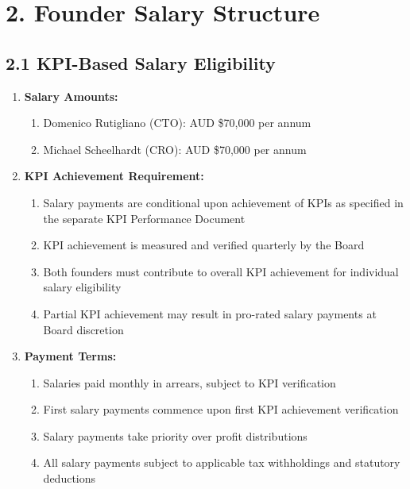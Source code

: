 \section*{2. Founder Salary Structure}

\subsection*{2.1 KPI-Based Salary Eligibility}
\begin{enumerate}[label=\arabic*.]
\item \textbf{Salary Amounts:}
    \begin{enumerate}[label=(\alph*)]
    \item Domenico Rutigliano (CTO): AUD \$70,000 per annum
    \item Michael Scheelhardt (CRO): AUD \$70,000 per annum
    \end{enumerate}

\item \textbf{KPI Achievement Requirement:}
    \begin{enumerate}[label=(\alph*)]
    \item Salary payments are conditional upon achievement of KPIs as specified in the separate KPI Performance Document
    \item KPI achievement is measured and verified quarterly by the Board
    \item Both founders must contribute to overall KPI achievement for individual salary eligibility
    \item Partial KPI achievement may result in pro-rated salary payments at Board discretion
    \end{enumerate}

\item \textbf{Payment Terms:}
    \begin{enumerate}[label=(\alph*)]
    \item Salaries paid monthly in arrears, subject to KPI verification
    \item First salary payments commence upon first KPI achievement verification
    \item Salary payments take priority over profit distributions
    \item All salary payments subject to applicable tax withholdings and statutory deductions
    \end{enumerate}
\end{enumerate}

